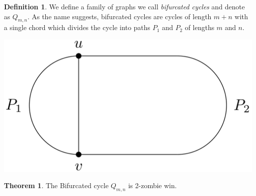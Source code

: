 \documentclass[letterpaper, 10pt]{article}
\begin{document}
\theoremstyle{definition}
\newtheorem{definition}{Definition}
\newtheorem{theorem}{Theorem}
\newtheorem{proposition}{Proposition}
\newtheorem{corollary}{Corollary}
\newtheorem{lemma}{Lemma}
\newtheorem{proofpart}{Part}
\makeatletter
{}
\makeatother

\begin{definition}
 We define a family of graphs we call \emph{bifurcated cycles} and denote as $Q_{m,n}$.
 As the name suggests, bifurcated cycles are cycles of length $m+n$ with a single chord
 which divides the cycle into paths $P_1$ and $P_2$ of lengths $m$ and $n$.
\end{definition}

\begin{center}
 \includegraphics[scale=0.20]{Q_m_n_basic}
\end{center}

\begin{theorem}
The Bifurcated cycle $Q_{m,n}$ is 2-zombie win.
\end{theorem}
\end{document}
